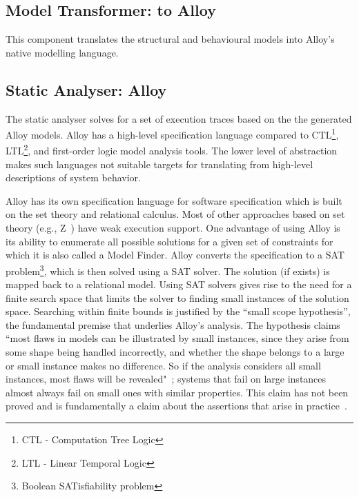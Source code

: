 \subsection{Model Transformer: to Alloy}
\label{sec:framework-overview-model-transformer}
This component translates the structural and behavioural models into Alloy's native modelling language.


\subsection{Static Analyser: Alloy}
\label{sec:framework-overview-static-analyser}
The static analyser solves for a set of execution traces based on the the generated Alloy models. Alloy has a high-level specification language compared to CTL\footnote{CTL - Computation Tree Logic}, LTL\footnote{LTL - Linear Temporal Logic}, and first-order logic model analysis tools. The lower level of abstraction makes such languages not suitable targets for translating from high-level descriptions of system behavior.

Alloy has its own specification language for software specification which is built on the set theory and relational calculus. Most of  other approaches based on set theory (e.g., Z~\cite{Spivey1992}) have weak execution support. One advantage of using Alloy is its ability to enumerate all possible solutions for a given set of constraints for which it is also called a Model Finder. Alloy converts the specification to a SAT problem\footnote{Boolean SATisfiability problem}, which is then solved using a SAT solver. The solution (if exists) is mapped back to a relational model. Using SAT solvers gives rise to the need for a finite search space that limits the solver to finding small instances of the solution space.
Searching within finite bounds is justified by the ``small scope hypothesis'', the fundamental premise that underlies Alloy's analysis. The hypothesis claims ``most flaws in models can be illustrated by small instances, since they arise from some shape being handled incorrectly, and whether the shape belongs to a large or small instance makes no difference. So if the analysis considers all small instances, most flaws will be revealed"~\cite{Jackson2012}; systems that fail on large instances
almost always fail on small ones with similar properties.
This claim has not been proved and is fundamentally a claim about the assertions that arise in practice~\cite{Jackson2012}. %

